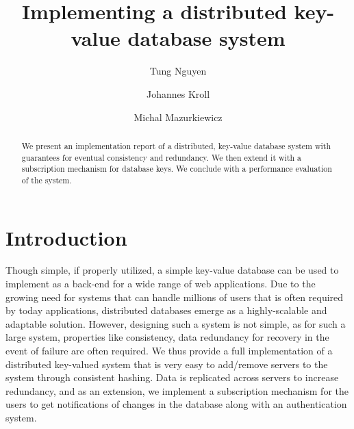 \documentclass[sigconf]{acmart}
\begin{document}
\title{Implementing a distributed key-value database system}

\author{Tung Nguyen}

\author{Johannes Kroll}

\author{Michal Mazurkiewicz}


\begin{abstract}
  We present an implementation report of a distributed, key-value database system with guarantees for eventual consistency and redundancy. We then extend it with a subscription mechanism for database keys. We conclude with a performance evaluation of the system.
\end{abstract}

\maketitle

\section{Introduction}
Though simple, if properly utilized, a simple key-value database can be used to implement as a back-end for a wide range of web applications. Due to the growing need for systems that can handle millions of users that is often required by today applications, distributed databases emerge as a highly-scalable and adaptable solution. However, designing such a system is not simple, as for such a large system, properties like consistency, data redundancy for recovery in the event of failure are often required. We thus provide a full implementation of a distributed key-valued system that is very easy to add/remove servers to the system through consistent hashing. Data is replicated across servers to increase redundancy, and as an extension, we implement a subscription mechanism for the users to get notifications of changes in the database along with an authentication system.
\end{document}
